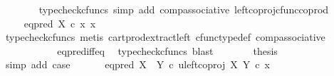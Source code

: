 \begin{isabellebody}
\ \ \ \ \ \ \isamarkupfalse%
\ {\isacharparenleft}{\kern0pt}typecheck{\isacharunderscore}{\kern0pt}cfuncs{\isacharcomma}{\kern0pt}\ simp\ add{\isacharcolon}{\kern0pt}\ comp{\isacharunderscore}{\kern0pt}associative{}\ left{\isacharunderscore}{\kern0pt}coproj{\isacharunderscore}{\kern0pt}cfunc{\isacharunderscore}{\kern0pt}coprod{\isacharparenright}{\kern0pt}\isanewline
\ \ \ \ \isamarkupfalse%
\ \isamarkupfalse%
\ {\isachardoublequoteopen}{\isachardot}{\kern0pt}{\isachardot}{\kern0pt}{\isachardot}{\kern0pt}\ {\isacharequal}{\kern0pt}\ eq{\isacharunderscore}{\kern0pt}pred\ X\ {\isasymcirc}\isactrlsub c\ {\isasymlangle}x{\isacharcomma}{\kern0pt}\ x{\isasymrangle}{\isachardoublequoteclose}\isanewline
\ \ \ \ \ \ \isamarkupfalse%
\ {\isacharparenleft}{\kern0pt}typecheck{\isacharunderscore}{\kern0pt}cfuncs{\isacharcomma}{\kern0pt}\ metis\ cart{\isacharunderscore}{\kern0pt}prod{\isacharunderscore}{\kern0pt}extract{\isacharunderscore}{\kern0pt}left\ cfunc{\isacharunderscore}{\kern0pt}type{\isacharunderscore}{\kern0pt}def\ comp{\isacharunderscore}{\kern0pt}associative{\isacharparenright}{\kern0pt}\isanewline
\ \ \ \ \isamarkupfalse%
\ \isamarkupfalse%
\ {\isachardoublequoteopen}{\isachardot}{\kern0pt}{\isachardot}{\kern0pt}{\isachardot}{\kern0pt}\ {\isacharequal}{\kern0pt}\ {\isasymt}{\isachardoublequoteclose}\isanewline
\ \ \ \ \ \ \isamarkupfalse%
\ eq{\isacharunderscore}{\kern0pt}pred{\isacharunderscore}{\kern0pt}iff{\isacharunderscore}{\kern0pt}eq\ \isamarkupfalse%
\ {\isacharparenleft}{\kern0pt}typecheck{\isacharunderscore}{\kern0pt}cfuncs{\isacharcomma}{\kern0pt}\ blast{\isacharparenright}{\kern0pt}\isanewline
\ \ \ \ \isamarkupfalse%
\ \isamarkupfalse%
\ {\isacharquery}{\kern0pt}thesis\isanewline
\ \ \ \ \ \ \isamarkupfalse%
\ {\isacharparenleft}{\kern0pt}simp\ add{\isacharcolon}{\kern0pt}\ case{}{\isacharparenright}{\kern0pt}\isanewline
\ \ \isamarkupfalse%
\isanewline
{}\isamarkupfalse%
\isanewline
\ \ \isamarkupfalse%
\ {\isachardoublequoteopen}eq{\isacharunderscore}{\kern0pt}pred\ {\isacharparenleft}{\kern0pt}X\ {\isasymCoprod}\ Y{\isacharparenright}{\kern0pt}\ {\isasymcirc}\isactrlsub c\ {\isasymlangle}u{\isacharcomma}{\kern0pt}left{\isacharunderscore}{\kern0pt}coproj\ X\ Y\ {\isasymcirc}\isactrlsub c\ x{\isasymrangle}\ {\isasymnoteq}\ {\isasymt}{\isachardoublequoteclose}\isanewline
\ \ \isamarkupfalse%

\end{isabellebody}
